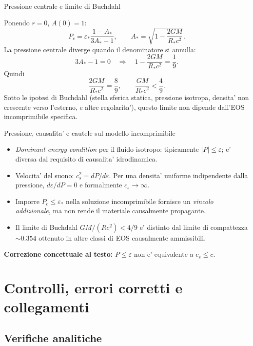 \begin{frame}[t]{Pressione centrale e limite di Buchdahl}\small\raggedright

Ponendo $r=0$, $A(0)=1$:
\[
P_c=\varepsilon_*\frac{1-A_*}{3A_*-1},
\qquad A_*=\sqrt{1-\frac{2GM}{R_*c^2}}.
\]
La pressione centrale diverge quando il denominatore si annulla:
\[
3A_*-1=0\quad\Longrightarrow\quad
1-\frac{2GM}{R_*c^2}=\frac19.
\]
Quindi
\[
\frac{2GM}{R_*c^2}=\frac89,
\qquad \boxed{\frac{GM}{R_*c^2}<\frac49.}
\]
Sotto le ipotesi di Buchdahl (stella sferica statica, pressione isotropa, densita' non crescente verso l'esterno, e altre regolarita'), questo limite non dipende dall'EOS incomprimibile specifica.

\end{frame}

\begin{frame}[t]{Pressione, causalita' e cautele sul modello incomprimibile}\small\raggedright

\begin{itemize}
\item \emph{Dominant energy condition} per il fluido isotropo: tipicamente $|P|\leq\varepsilon$; e' diversa dal requisito di causalita' idrodinamica.
\item Velocita' del suono: $c_s^2=dP/d\varepsilon$. Per una densita' uniforme indipendente dalla pressione, $d\varepsilon/dP=0$ e formalmente $c_s\to\infty$.
\item Imporre $P_c\leq\varepsilon_*$ nella soluzione incomprimibile fornisce un \emph{vincolo addizionale}, ma non rende il materiale causalmente propagante.
\item Il limite di Buchdahl $GM/(Rc^2)<4/9$ e' distinto dal limite di compattezza $\sim0.354$ ottenuto in altre classi di EOS causalmente ammissibili.
\end{itemize}
\medskip
\textbf{Correzione concettuale al testo:} $P\leq\varepsilon$ non e' equivalente a $c_s\leq c$.

\end{frame}

\section{Controlli, errori corretti e collegamenti}\subsection{Verifiche analitiche}

